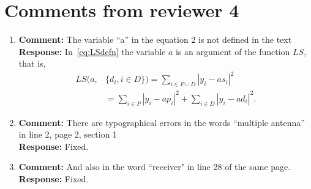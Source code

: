 \documentclass{article}
\newcommand{\abs}[1]{{\left\vert #1 \right\vert}}
\begin{document}
\section{Comments from reviewer 4}

\begin{enumerate}

\item \textbf{Comment:}  The variable  ``a'' in the equation 2 is not defined in the text \\
\textbf{Response:} In~\eqref{eq:LSdefn} the variable $a$ is an argument of the function $LS$, that is,
\[
\begin{split}
LS(a, &\{d_i, i \in D\}) = \sum_{i \in P \cup D} \abs{ y_i - a s_i }^2  \\
&= \sum_{i \in P} \abs{ y_i - a p_i }^2 + \sum_{i \in D} \abs{ y_i - a d_i }^2.
\end{split}
\]

\item \textbf{Comment:}  There are typographical errors in the words  ``multiple antenna'' in line 2, page 2, section 1 \\
\textbf{Response:} Fixed.

\item \textbf{Comment:}  And also in the word ``receiver" in line 28 of the same page.
 \\
\textbf{Response:} Fixed.


\end{enumerate}

{
\small

}
\end{document}
